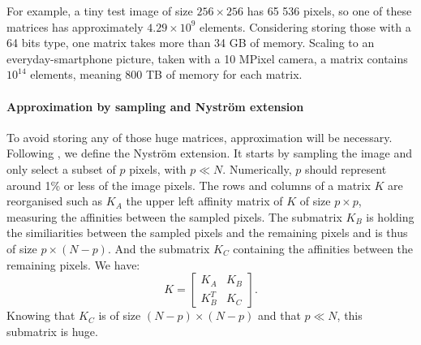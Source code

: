 For example, a tiny test image of size \(256 \times 256\) has 65 536 pixels, so one of these matrices has approximately \(4.29 \times 10^9\) elements.
Considering storing those with a 64 bits type, one matrix takes more than 34 GB of memory.
Scaling to an everyday-smartphone picture, taken with a 10 MPixel camera, a matrix contains \(10^{14}\) elements, meaning 800 TB of memory for each matrix.

\paragraph{Approximation by sampling and Nystr\"om extension}

To avoid storing any of those huge matrices, approximation will be necessary.
Following \cite{fowlkes_spectral_2004}, we define the Nystr\"om extension.
It starts by sampling the image and only select a subset of \(p\) pixels, with \(p \ll N\).
Numerically, \(p\) should represent around 1\% or less of the image pixels.
The rows and columns of a matrix \(K\) are reorganised such as \(K_A\) the upper left affinity matrix of \(K\) of size \(p \times p\), measuring the affinities between the sampled pixels.
The submatrix \(K_B\) is holding the similiarities between the sampled pixels and the remaining pixels and is thus of size \(p \times (N-p)\).
And the submatrix \(K_C\) containing the affinities between the remaining pixels.
We have:
\[K = \begin{bmatrix}K_A & K_B \\ K_B^T & K_C\end{bmatrix}.\]
Knowing that \(K_C\) is of size \((N-p) \times (N-p)\) and that \(p \ll N\), this submatrix is huge.

